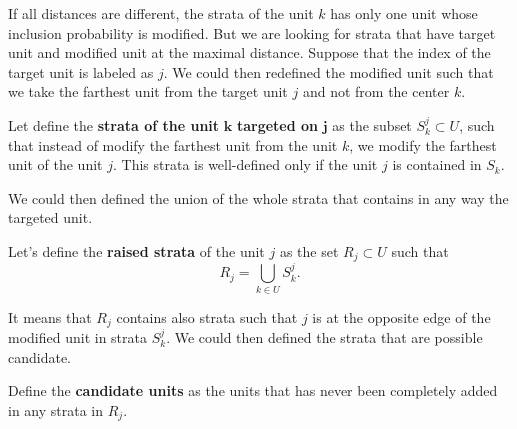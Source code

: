 \documentclass[12pt,english]{article}\usepackage[]{graphicx}\usepackage{xcolor}
\begin{document}
If all distances are different, the strata of the unit $k$ has only one unit whose inclusion probability is modified. But we are looking for strata that have target unit and modified unit at the maximal distance. Suppose that the index of the target unit is labeled as $j$. We could then redefined the modified unit such that we take the farthest unit from the target unit $j$ and not from the center $k$.

\begin{defn}
Let define the \textbf{strata of the unit } $\boldsymbol k $\textbf{ targeted on } $\boldsymbol j$ as the subset $S_k^j \subset U$, such that instead of modify the farthest unit from the unit $k$, we modify the farthest unit of the unit $j$. This strata is well-defined only if the unit $j$ is contained in $S_k$.
\end{defn}
We could then defined the union of the whole strata that contains in any way the targeted unit.
\begin{defn}Let's define the \textbf{raised strata} of the unit $j$ as the set $R_j\subset U$ such that
$$ R_j = \bigcup_{k \in U} S_k^j.$$
\end{defn}
It means that $R_j$ contains also strata such that $j$ is at the opposite edge of the modified unit in strata $S_k^j$. We could then defined the strata that are possible candidate.

\begin{defn} Define the \textbf{candidate units} as the units that has never been completely added in any strata in $R_j$.
\end{defn}
\end{document}
